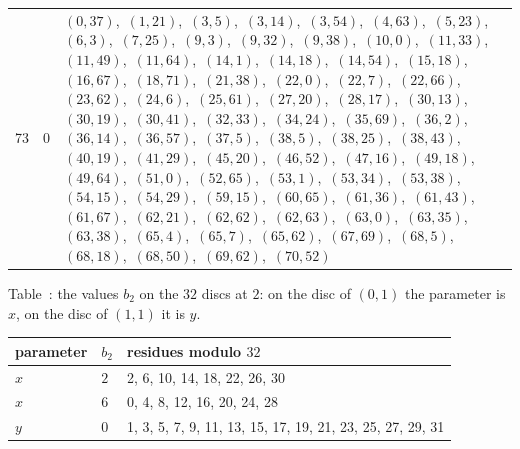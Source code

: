 \documentclass[11pt]{article}
\newcounter{dtab}
\begin{document}
{\begin{longtable}{@{}rl>{\raggedright\arraybackslash}p{}@{}}
73 & $0$ & $(0,37)$,\allowbreak\ $(1,21)$,\allowbreak\ $(3,5)$,\allowbreak\ $(3,14)$,\allowbreak\ $(3,54)$,\allowbreak\ $(4,63)$,\allowbreak\ $(5,23)$,\allowbreak\ $(6,3)$,\allowbreak\ $(7,25)$,\allowbreak\ $(9,3)$,\allowbreak\ $(9,32)$,\allowbreak\ $(9,38)$,\allowbreak\ $(10,0)$,\allowbreak\ $(11,33)$,\allowbreak\ $(11,49)$,\allowbreak\ $(11,64)$,\allowbreak\ $(14,1)$,\allowbreak\ $(14,18)$,\allowbreak\ $(14,54)$,\allowbreak\ $(15,18)$,\allowbreak\ $(16,67)$,\allowbreak\ $(18,71)$,\allowbreak\ $(21,38)$,\allowbreak\ $(22,0)$,\allowbreak\ $(22,7)$,\allowbreak\ $(22,66)$,\allowbreak\ $(23,62)$,\allowbreak\ $(24,6)$,\allowbreak\ $(25,61)$,\allowbreak\ $(27,20)$,\allowbreak\ $(28,17)$,\allowbreak\ $(30,13)$,\allowbreak\ $(30,19)$,\allowbreak\ $(30,41)$,\allowbreak\ $(32,33)$,\allowbreak\ $(34,24)$,\allowbreak\ $(35,69)$,\allowbreak\ $(36,2)$,\allowbreak\ $(36,14)$,\allowbreak\ $(36,57)$,\allowbreak\ $(37,5)$,\allowbreak\ $(38,5)$,\allowbreak\ $(38,25)$,\allowbreak\ $(38,43)$,\allowbreak\ $(40,19)$,\allowbreak\ $(41,29)$,\allowbreak\ $(45,20)$,\allowbreak\ $(46,52)$,\allowbreak\ $(47,16)$,\allowbreak\ $(49,18)$,\allowbreak\ $(49,64)$,\allowbreak\ $(51,0)$,\allowbreak\ $(52,65)$,\allowbreak\ $(53,1)$,\allowbreak\ $(53,34)$,\allowbreak\ $(53,38)$,\allowbreak\ $(54,15)$,\allowbreak\ $(54,29)$,\allowbreak\ $(59,15)$,\allowbreak\ $(60,65)$,\allowbreak\ $(61,36)$,\allowbreak\ $(61,43)$,\allowbreak\ $(61,67)$,\allowbreak\ $(62,21)$,\allowbreak\ $(62,62)$,\allowbreak\ $(62,63)$,\allowbreak\ $(63,0)$,\allowbreak\ $(63,35)$,\allowbreak\ $(63,38)$,\allowbreak\ $(65,4)$,\allowbreak\ $(65,7)$,\allowbreak\ $(65,62)$,\allowbreak\ $(67,69)$,\allowbreak\ $(68,5)$,\allowbreak\ $(68,18)$,\allowbreak\ $(68,50)$,\allowbreak\ $(69,62)$,\allowbreak\ $(70,52)$\\
\end{longtable}
}

\begin{center}
\label{tab:local8two}
Table~\thedtab: the values $b_2$ on the $32$ discs at $2$: on the disc of $(0,1)$ the parameter is $x$, on the disc of $(1,1)$ it is $y$.

\smallskip
{\footnotesize
\begin{tabular}{@{}lll@{}}
\toprule parameter & $b_2$ & residues modulo $32$\\\midrule
$x$ & $2$ & 2, 6, 10, 14, 18, 22, 26, 30\\
$x$ & $6$ & 0, 4, 8, 12, 16, 20, 24, 28\\
$y$ & $0$ & 1, 3, 5, 7, 9, 11, 13, 15, 17, 19, 21, 23, 25, 27, 29, 31\\
\bottomrule
\end{tabular}
}
\end{center}
\end{document}
